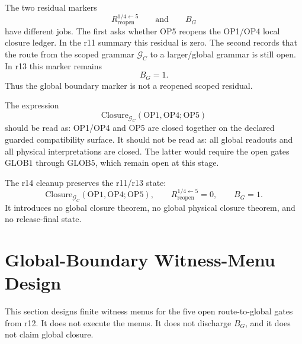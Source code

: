 \begin{proposition}
The two residual markers
\[
    R_{\mathrm{reopen}}^{1/4\leftarrow 5}
    \qquad\text{and}\qquad
    B_G
\]
have different jobs.  The first asks whether OP5 reopens the OP1/OP4 local
closure ledger.  In the r11 summary this residual is zero.  The second records
that the route from the scoped grammar \(\mathcal G_C\) to a larger/global
grammar is still open.  In r13 this marker remains
\[
    B_G=1.
\]
Thus the global boundary marker is not a reopened scoped residual.
\end{proposition}

\begin{remark}
The expression
\[
    \mathrm{Closure}_{\mathcal G_C}(\mathrm{OP1},\mathrm{OP4};\mathrm{OP5})
\]
should be read as: OP1/OP4 and OP5 are closed together on the declared guarded
compatibility surface.  It should not be read as: all global readouts and all
physical interpretations are closed.  The latter would require the open gates
\(\mathrm{GLOB1}\) through \(\mathrm{GLOB5}\), which remain open at this stage.
\end{remark}

\begin{theorem}
The r14 cleanup preserves the r11/r13 state:
\[
    \mathrm{Closure}_{\mathcal G_C}(\mathrm{OP1},\mathrm{OP4};\mathrm{OP5}),
    \qquad
    R_{\mathrm{reopen}}^{1/4\leftarrow 5}=0,
    \qquad
    B_G=1.
\]
It introduces no global closure theorem, no global physical closure theorem,
and no release-final state.
\end{theorem}



\section{Global-Boundary Witness-Menu Design}
\label{sec:v450-r15-global-boundary-witness-menu-design}

This section designs finite witness menus for the five open route-to-global
gates from r12.  It does not execute the menus.  It does not discharge
\(B_G\), and it does not claim global closure.

